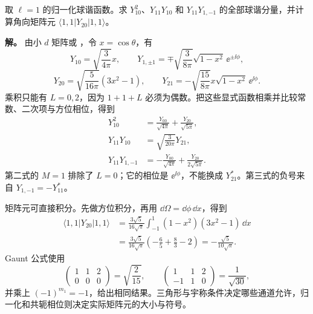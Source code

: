 \begin{example}
取 $\ell=1$ 的归一化球谐函数。求 $Y_{10}^2$、$Y_{11}Y_{10}$ 和 $Y_{11}Y_{1,-1}$ 的全部球谐分量，并计算角向矩阵元 $\langle1,1|Y_{20}|1,1\rangle$。

\textbf{解。} 由小 $d$ 矩阵或 ，令 $x=\cos\theta$，有
\[
Y_{10}=\sqrt{\frac3{4\pi}}x,\qquad
Y_{1,\pm1}=\mp\sqrt{\frac3{8\pi}}\sqrt{1-x^2}\,\ee^{\pm\ii\phi},
\]
\[
Y_{20}=\sqrt{\frac5{16\pi}}(3x^2-1),\qquad
Y_{21}=-\sqrt{\frac{15}{8\pi}}x\sqrt{1-x^2}\,\ee^{\ii\phi}.
\]
乘积只能有 $L=0,2$，因为 $1+1+L$ 必须为偶数。把这些显式函数相乘并比较常数、二次项与方位相位，得到
\begin{align*}
Y_{10}^2&=\frac{Y_{00}}{\sqrt{4\pi}}+\frac{Y_{20}}{\sqrt{5\pi}},\\
Y_{11}Y_{10}&=\sqrt{\frac3{20\pi}}Y_{21},\\
Y_{11}Y_{1,-1}&=-\frac{Y_{00}}{\sqrt{4\pi}}+\frac{Y_{20}}{2\sqrt{5\pi}}.
\end{align*}
第二式的 $M=1$ 排除了 $L=0$；它的相位是 $\ee^{\ii\phi}$，不能换成 $Y_{21}^*$。第三式的负号来自 $Y_{1,-1}=-Y_{11}^*$。

矩阵元可直接积分。先做方位积分，再用 $\dd\Omega=\dd\phi\,\dd x$，得到
\begin{align*}
\langle1,1|Y_{20}|1,1\rangle
&=\frac{3\sqrt5}{16\sqrt\pi}\int_{-1}^{1}(1-x^2)(3x^2-1)\,\dd x\\
&=\frac{3\sqrt5}{16\sqrt\pi}\left(-\frac65+\frac83-2\right)
=-\frac{\sqrt5}{10\sqrt\pi}.
\end{align*}
Gaunt 公式使用
\[
\begin{pmatrix}1&1&2\\0&0&0\end{pmatrix}=\sqrt{\frac2{15}},\qquad
\begin{pmatrix}1&1&2\\-1&1&0\end{pmatrix}=\frac1{\sqrt{30}},
\]
并乘上 $(-1)^{m_1}=-1$，给出相同结果。三角形与宇称条件决定哪些通道允许，归一化和共轭相位则决定实际矩阵元的大小与符号。
\end{example}

